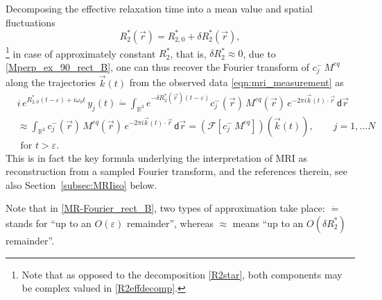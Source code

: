 \documentclass{ws-m3as}
\newcommand\taup{\varepsilon}
\begin{document}
Decomposing the effective relaxation time into a mean value and spatial fluctuations
\begin{equation}\label{R2effdecomp}
R_2^*(\vec r) = R_{2,0}^*+\delta R_2^*(\vec r),
\end{equation}
\footnote{Note that as opposed to the decomposition \eqref{R2star}, both components may be complex valued in \eqref{R2effdecomp}.}
in case of approximately constant $R_2^*$, that is, $\delta R_2^*\approx0$, 
due to \eqref{Mperp_ex_90_rect_B},
one can thus recover the Fourier transform of $c^-_j\,M^{eq}$ along the trajectories ${\vec k}(t)$ from the observed data \eqref{eqn:mri_measurement} as
\begin{equation}\label{MR-Fourier_rect_B} 
\begin{aligned}
&i\,e^{R_{2,0}^*(t-\taup)+ i\omega_0t} \, y_j(t) 
\dot{=} \int_{\mathbb{R}^3} e^{-\delta R_2^*(\vec r)(t-\taup)} c^-_j(\vec r)\,M^{eq}(\vec r) \, e^{-2\pi i {\vec k}(t)\cdot{\vec r}}  \,\textsf{d}\vec r\\
&\approx \int_{\mathbb{R}^3} c^-_j(\vec r)\,M^{eq}(\vec r) \, e^{-2\pi i {\vec k}(t)\cdot{\vec r}}  \,\textsf{d}\vec r
=(\mathcal{F}[c^-_j\,M^{eq}])({\vec k}(t))
,\qquad j=1,\ldots N\\
&\text{ for }t>\taup.
\end{aligned}
\end{equation}
This is in fact the key formula underlying the interpretation of MRI as reconstruction from a sampled Fourier transform, \cite{Nishimura2010,Uecker2009NonlinearRM} and the references therein, see also Section~\ref{subsec:MRIiso} below.

Note that in \eqref{MR-Fourier_rect_B}, two types of approximation take place: $\dot{=}$ stands for ``up to an $O(\taup)$ remainder'', whereas $\approx$ means ``up to an $O(\delta R_2^*)$ remainder''.

\smallskip
\end{document}
